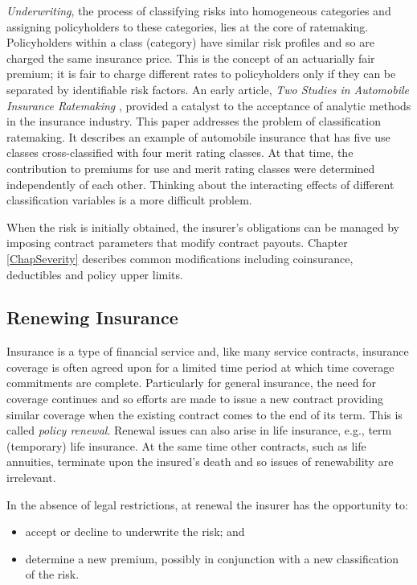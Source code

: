 \documentclass[
]{book}
\providecommand{\tightlist}{%
  \setlength{\itemsep}{0pt}\setlength{\parskip}{0pt}}
\begin{document}
\emph{Underwriting}, the process of classifying risks into homogeneous
categories and assigning policyholders to these categories, lies at the
core of ratemaking. Policyholders within a class (category) have similar risk
profiles and so are charged the same insurance price. This is the
concept of an actuarially fair premium; it is fair to charge
different rates to policyholders only if they can be separated by
identifiable risk factors. An early article, \emph{Two Studies in Automobile Insurance Ratemaking} \citep{bailey1960}, provided a catalyst to the acceptance of analytic methods in the insurance industry. This paper addresses the problem of classification ratemaking.
It describes an example of automobile insurance that has five use
classes cross-classified with four merit rating classes. At that time,
the contribution to premiums for use and merit rating classes were
determined independently of each other. Thinking about the interacting
effects of different classification variables is a more difficult
problem.

When the risk is initially obtained, the insurer's obligations can be managed by imposing contract parameters that modify contract payouts. Chapter \ref{ChapSeverity} describes common modifications including coinsurance, deductibles and policy upper limits.

\hypertarget{renewing-insurance}{%
\subsection{Renewing Insurance}\label{renewing-insurance}}

Insurance is a type of financial service and, like many service
contracts, insurance coverage is often agreed upon for a limited time
period at which time coverage commitments are
complete. Particularly for general insurance, the need for coverage continues and so efforts are made to issue a new contract providing similar coverage when the existing contract comes to the end of its term. This is called \emph{policy renewal}. Renewal issues can also arise in life insurance, e.g.,
term (temporary) life insurance. At the same time other contracts, such as life
annuities, terminate upon the insured's death and so issues of
renewability are irrelevant.

In the absence of legal restrictions, at renewal the insurer has the opportunity to:

\begin{itemize}
\tightlist
\item
  accept or decline to underwrite the risk; and
\item
  determine a new premium, possibly in conjunction with a new
  classification of the risk.
\end{itemize}
\end{document}
